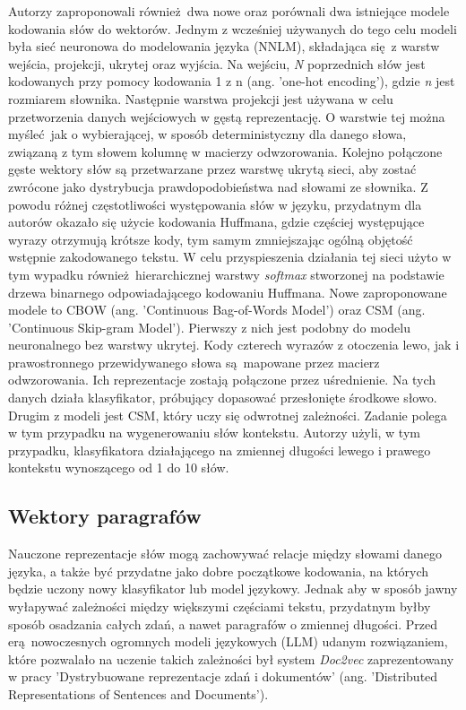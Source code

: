 Autorzy zaproponowali również dwa nowe oraz porównali dwa istniejące modele kodowania słów do wektorów. Jednym z wcześniej używanych do tego celu modeli była sieć neuronowa do modelowania języka (NNLM), składająca się z warstw wejścia, projekcji, ukrytej oraz wyjścia. Na wejściu, \emph{N} poprzednich słów jest kodowanych przy pomocy kodowania 1 z n (ang. 'one-hot encoding'), gdzie \emph{n} jest rozmiarem słownika. Następnie warstwa projekcji jest używana w celu przetworzenia danych wejściowych w gęstą reprezentację. O warstwie tej można myśleć jak o wybierającej, w sposób deterministyczny dla danego słowa, związaną z tym słowem kolumnę w macierzy odwzorowania. Kolejno połączone gęste wektory słów są przetwarzane przez warstwę ukrytą sieci, aby zostać zwrócone jako dystrybucja prawdopodobieństwa nad słowami ze słownika. Z powodu różnej częstotliwości występowania słów w języku, przydatnym dla autorów okazało się użycie kodowania Huffmana, gdzie częściej występujące wyrazy otrzymują krótsze kody, tym samym zmniejszając ogólną objętość wstępnie zakodowanego tekstu. W celu przyspieszenia działania tej sieci użyto w tym wypadku również hierarchicznej warstwy \emph{softmax} stworzonej na podstawie drzewa binarnego odpowiadającego kodowaniu Huffmana. Nowe zaproponowane modele to CBOW (ang. 'Continuous Bag-of-Words Model') oraz CSM (ang. 'Continuous Skip-gram Model'). Pierwszy z nich jest podobny do modelu neuronalnego bez warstwy ukrytej. Kody czterech wyrazów z otoczenia lewo, jak i prawostronnego przewidywanego słowa są mapowane przez macierz odwzorowania. Ich reprezentacje zostają połączone przez uśrednienie. Na tych danych działa klasyfikator, próbujący dopasować przesłonięte środkowe słowo. Drugim z modeli jest CSM, który uczy się odwrotnej zależności. Zadanie polega w tym przypadku na wygenerowaniu słów kontekstu. Autorzy użyli, w tym przypadku, klasyfikatora działającego na zmiennej długości lewego i prawego kontekstu wynoszącego od 1 do 10 słów.\autocite{mikolov2013efficient}

\subsection{Wektory paragrafów}

Nauczone reprezentacje słów mogą zachowywać relacje między słowami danego języka, a także być przydatne jako dobre początkowe kodowania, na których będzie uczony nowy klasyfikator lub model językowy. Jednak aby w sposób jawny wyłapywać zależności między większymi częściami tekstu, przydatnym byłby sposób osadzania całych zdań, a nawet paragrafów o zmiennej długości. Przed erą nowoczesnych ogromnych modeli językowych (LLM) udanym rozwiązaniem, które pozwalało na uczenie takich zależności był system \emph{Doc2vec} zaprezentowany w pracy 'Dystrybuowane reprezentacje zdań i dokumentów' (ang. 'Distributed Representations of Sentences and Documents').\newline

